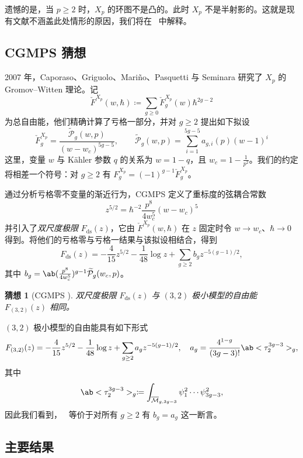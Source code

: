 \documentclass{amsart}
\newtheorem{conj}[thm]{猜想}
\theoremstyle{definition}
\theoremstyle{remark}
\theoremstyle{plain}
\theoremstyle{definition}
\theoremstyle{remark}
\newcommand{\Mbar}{\overline{\mathcal{M}}}
\newcommand{\mc}[1]{\mathcal{#1}}
\newcommand{\mr}[1]{\mathrm{#1}}
\newcommand{\wt}[1]{\widetilde{#1}}
\newcommand{\1}{\mathbf{1}}
\newcommand{\2}{\mathbf{2}}
\newcommand{\3}{\mathbf{3}}
\begin{document}
遗憾的是，当 \(p \geq 2\) 时，\(X_p\) 的环图不是凸的。此时 \(X_p\) 不是半射影的。这就是现有文献不涵盖此处情形的原因，我们将在~ 中解释。

\subsection{CGMPS 猜想}%
\label{sub:The conjecture of CGMPS}

2007 年，Caporaso、Griguolo、Mari\~{n}o、Pasquetti 与 Seminara 研究了 \(X_p\) 的 Gromov--Witten 理论。记
\[ \check{F}^{X_p}(w,\hbar) \coloneqq \sum_{g \geq 0} \check{F}_g^{X_p}(w) \hbar^{2g-2} \]
为总自由能，他们精确计算了亏格一部分，并对 \(g \geq 2\) 提出如下拟设
\begin{equation}\label{eqn:cgmps ansatz}
    \check{F}_g^{X_p} = \frac{\wt{\mc{P}}_g(w,p)}{(w-w_c)^{5g-5}}, \qquad \wt{\mc{P}}_g(w,p) = \sum_{i=1}^{5g-5} a_{g,i}(p)(w-1)^i
\end{equation}
这里，变量 \(w\) 与 Kähler 参数 \(q\) 的关系为 \(w = 1-q\)，且 \(w_c = 1 - \frac{1}{p^2}\)。我们的约定将相差一个符号：对 \(g \geq 2\) 有 \(F_g^{X_p} = (-1)^{g-1}\check{F}_g^{X_p}\)。

通过分析亏格零不变量的渐近行为，CGMPS 定义了重标度的弦耦合常数
\[ z^{5/2} = \hbar^{-2} \frac{p^8}{4w_c^5}(w-w_c)^5 \]
并引入了\textit{双尺度极限} \(F_{\mr{ds}}(z)\)，它由 \(\check{F}^{X_p}(w,\hbar)\) 在 \(z\) 固定时令 \(w \to w_c\)、\(\hbar \to 0\) 得到。将他们的亏格零与亏格一结果与该拟设相结合，得到
\[ F_{\mr{ds}}(z) = -\frac{4}{15}z^{5/2} - \frac{1}{48}\log z + \sum_{g \geq 2} b_g z^{-5(g-1)/2}, \]
其中 \(b_g = \ab(\frac{p^8}{4w_c^5})^{g-1}\wt{\mc{P}}_g(w_c,p)\)。

\begin{conj}[CGMPS {\cite{CGMPS2007}}]%
\label{conj:cgmps}
    双尺度极限 \(F_{\mr{ds}}(z)\) 与 \((3,2)\) 极小模型的自由能 \(F_{(3,2)}(z)\) 相同。
\end{conj}

\((3,2)\) 极小模型的自由能具有如下形式
\[ F_{(3,2)}(z) = -\frac{4}{15}z^{5/2} - \frac{1}{48}\log z + \sum_{g\geq2} a_g z^{-5(g-1)/2}, \quad a_g = \frac{4^{1-g}}{(3g-3)!}\ab<\tau_2^{3g-3}>_g, \]
其中
\[ \ab<\tau_2^{3g-3}>_g \coloneqq \int_{\Mbar_{g,3g-3}} \psi_1^2 \cdots \psi_{3g-3}^2, \]
因此我们看到，~ 等价于对所有 \(g \geq 2\) 有 \(b_g = a_g\) 这一断言。

\subsection{主要结果}%
\label{sub:The main results (Guo local P1)}
\end{document}
